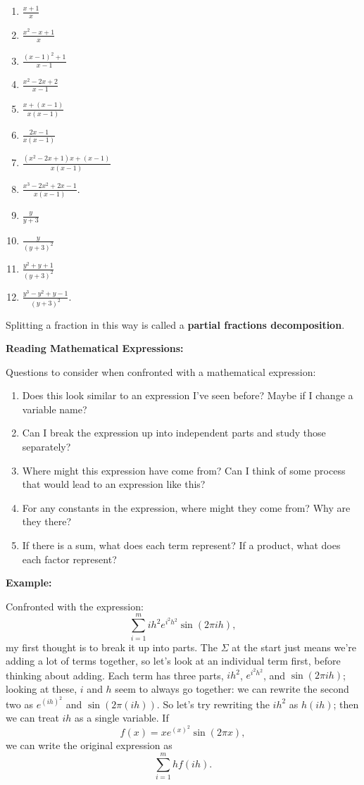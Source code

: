 \documentclass{article}
\begin{document}
\begin{enumerate}
	\item $\frac{x+1}{x}$
	\item $\frac{x^2-x+1}{x}$
	\item $\frac{(x-1)^2+1}{x-1}$
	\item $\frac{x^2-2x+2}{x-1}$
	\item $\frac{x + (x-1)}{x(x-1)}$
	\item $\frac{2x-1}{x(x-1)}$
	\item $\frac{(x^2-2x+1)x + (x-1)}{x(x-1)}$
	\item $\frac{x^3-2x^2+2x-1}{x(x-1)}$.
	\item $\frac{y}{y+3}$
	\item $\frac{y}{(y+3)^2}$
	\item $\frac{y^2+y+1}{(y+3)^2}$
	\item $\frac{y^3-y^2+y-1}{(y+3)^2}$.
\end{enumerate}

Splitting a fraction in this way is called a \textbf{partial fractions decomposition}.



\clearpage








\textbf{Reading Mathematical Expressions:}\bigskip

Questions to consider when confronted with a mathematical expression:

\begin{enumerate}
	\item Does this look similar to an expression I've seen before? Maybe if I change a variable name?
	\item Can I break the expression up into independent parts and study those separately?
	\item Where might this expression have come from? Can I think of some process that would lead to an expression like this?
	\item For any constants in the expression, where might they come from? Why are they there?
	\item If there is a sum, what does each term represent? If a product, what does each factor represent?
\end{enumerate}
\medskip

\textbf{Example:}\bigskip

Confronted with the expression:
\[\sum_{i=1}^m ih^2 e^{i^2h^2} \sin(2\pi ih),\]
my first thought is to break it up into parts. The $\Sigma$ at the start just means we're adding a lot of terms together, so let's look at an individual term first, before thinking about adding. Each term has three parts, $ih^2$, $e^{i^2h^2}$, and $\sin(2\pi ih)$; looking at these, $i$ and $h$ seem to always go together: we can rewrite the second two as $e^{(ih)^2}$ and $\sin(2\pi (ih))$. So let's try rewriting the $ih^2$ as $h(ih)$; then we can treat $ih$ as a single variable. If
\[f(x)=xe^{(x)^2}\sin(2\pi x),\]
we can write the original expression as
\[\sum_{i=1}^m hf(ih).\]
\end{document}
